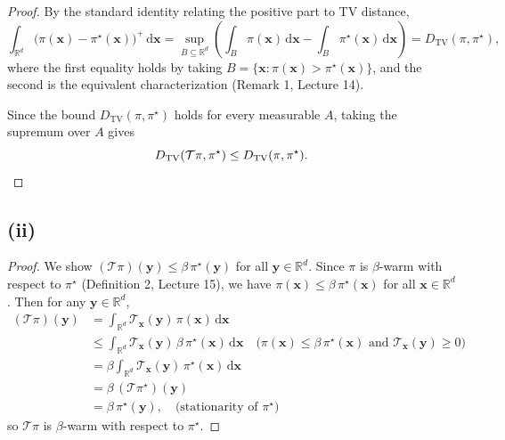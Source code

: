 \begin{proof}
By the standard identity relating the positive part to TV distance,
\[
\int_{\mathbb{R}^d} \bigl(\pi(\mathbf{x}) - \pi^\star(\mathbf{x})\bigr)^+ \,\mathrm{d}\mathbf{x}
= \sup_{B \subseteq \mathbb{R}^d} \left( \int_{B} \pi(\mathbf{x}) \,\mathrm{d}\mathbf{x} - \int_{B} \pi^\star(\mathbf{x}) \,\mathrm{d}\mathbf{x} \right)
= D_{\mathrm{TV}}(\pi, \pi^\star),
\]
where the first equality holds by taking $B = \{\mathbf{x} : \pi(\mathbf{x}) > \pi^\star(\mathbf{x})\}$, and the second is the equivalent characterization (Remark 1, Lecture 14).

Since the bound $D_{\mathrm{TV}}(\pi, \pi^\star)$ holds for every measurable $A$, taking the supremum over $A$ gives
\[
D_{\mathrm{TV}}(\mathcal{T}\pi, \pi^\star) \leq D_{\mathrm{TV}}(\pi, \pi^\star). \qedhere
\]
\end{proof}

\subsection*{(ii)}

\begin{proof}
We show $(\mathcal{T}\pi)(\mathbf{y}) \leq \beta \, \pi^\star(\mathbf{y})$ for all $\mathbf{y} \in \mathbb{R}^d$. Since $\pi$ is $\beta$-warm with respect to $\pi^\star$ (Definition 2, Lecture 15), we have $\pi(\mathbf{x}) \leq \beta \, \pi^\star(\mathbf{x})$ for all $\mathbf{x} \in \mathbb{R}^d$. Then for any $\mathbf{y} \in \mathbb{R}^d$,
\begin{align*}
(\mathcal{T}\pi)(\mathbf{y})
&= \int_{\mathbb{R}^d} \mathcal{T}_{\mathbf{x}}(\mathbf{y})\, \pi(\mathbf{x}) \,\mathrm{d}\mathbf{x} \\
&\leq \int_{\mathbb{R}^d} \mathcal{T}_{\mathbf{x}}(\mathbf{y})\, \beta \, \pi^\star(\mathbf{x}) \,\mathrm{d}\mathbf{x} \quad \text{($\pi(\mathbf{x}) \leq \beta\, \pi^\star(\mathbf{x})$ and } \mathcal{T}_{\mathbf{x}}(\mathbf{y}) \geq 0\text{)} \\
&= \beta \int_{\mathbb{R}^d} \mathcal{T}_{\mathbf{x}}(\mathbf{y})\, \pi^\star(\mathbf{x}) \,\mathrm{d}\mathbf{x} \\
&= \beta \, (\mathcal{T}\pi^\star)(\mathbf{y}) \\
&= \beta \, \pi^\star(\mathbf{y}), \quad \text{(stationarity of $\pi^\star$)}
\end{align*}
so $\mathcal{T}\pi$ is $\beta$-warm with respect to $\pi^\star$.
\end{proof}
